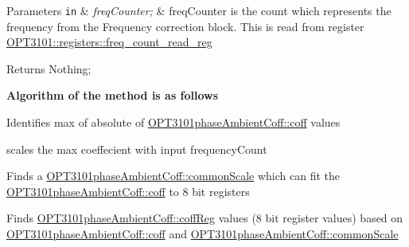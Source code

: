 \begin{DoxyParams}[1]{Parameters}
\mbox{\tt in}  & {\em freq\+Counter;} & freq\+Counter is the count which represents the frequency from the Frequency correction block. This is read from register \mbox{\hyperlink{class_o_p_t3101_1_1registers_a0d343738560c0bc418f34b458735a811}{O\+P\+T3101\+::registers\+::freq\+\_\+count\+\_\+read\+\_\+reg}} \\
\hline
\end{DoxyParams}
\begin{DoxyReturn}{Returns}
Nothing; 
\end{DoxyReturn}
{\bfseries Algorithm of the method is as follows}


\begin{DoxyItemize}
\item Identifies max of absolute of \mbox{\hyperlink{class_o_p_t3101phase_ambient_coff_a0174483b15a3819cf8b30fcad00f7dda}{O\+P\+T3101phase\+Ambient\+Coff\+::coff}} values ~\newline
~\newline
~\newline

\item scales the max coeffecient with input frequency\+Count ~\newline
~\newline

\item Finds a \mbox{\hyperlink{class_o_p_t3101phase_ambient_coff_ac2976af69df6837bd7bc1881b87f7188}{O\+P\+T3101phase\+Ambient\+Coff\+::common\+Scale}} which can fit the \mbox{\hyperlink{class_o_p_t3101phase_ambient_coff_a0174483b15a3819cf8b30fcad00f7dda}{O\+P\+T3101phase\+Ambient\+Coff\+::coff}} to 8 bit registers
\item Finds \mbox{\hyperlink{class_o_p_t3101phase_ambient_coff_a7b9be6815f936c44329b53f5f57b3d6c}{O\+P\+T3101phase\+Ambient\+Coff\+::coff\+Reg}} values (8 bit register values) based on \mbox{\hyperlink{class_o_p_t3101phase_ambient_coff_a0174483b15a3819cf8b30fcad00f7dda}{O\+P\+T3101phase\+Ambient\+Coff\+::coff}} and \mbox{\hyperlink{class_o_p_t3101phase_ambient_coff_ac2976af69df6837bd7bc1881b87f7188}{O\+P\+T3101phase\+Ambient\+Coff\+::common\+Scale}} 
\end{DoxyItemize}\mbox{\label{class_o_p_t3101phase_ambient_coff_a9a0cc8986689fd6bb3c2fdc13f3182d6}} 
